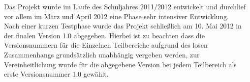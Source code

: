 Das Projekt wurde im Laufe des Schuljahres 2011/2012 entwickelt und durchlief vor allem im März und April 2012 eine Phase sehr intensiver Entwicklung.\\
Nach einer kurzen Testphase wurde das Projekt schließlich am 10. Mai 2012 in der finalen Version 1.0 abgegeben. Hierbei ist zu beachten dass die Versionsnummern für die Einzelnen Teilbereiche aufgrund des losen Zusammenhangs grundsätzlich unabhängig vergeben werden, zur Vereinheitlichung wurde für die abgegebene Version bei jedem Teilbereich als erste Versionsnummer 1.0 gewählt. 
